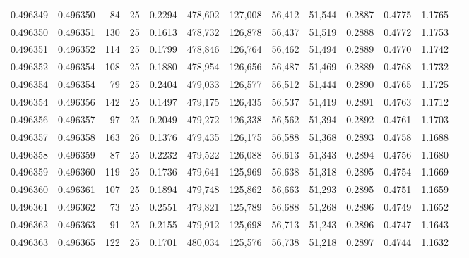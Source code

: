 \begin{tabular}{rrrrrrrrrrrrr}
0.496349 & 0.496350 &    84 &  25 &                                     0.2294 & 478,602 & 127,008 &  56,412 &  51,544 & 0.2887 & 0.4775 & 1.1765 \\
0.496350 & 0.496351 &   130 &  25 &                                     0.1613 & 478,732 & 126,878 &  56,437 &  51,519 & 0.2888 & 0.4772 & 1.1753 \\
0.496351 & 0.496352 &   114 &  25 &                                     0.1799 & 478,846 & 126,764 &  56,462 &  51,494 & 0.2889 & 0.4770 & 1.1742 \\
0.496352 & 0.496354 &   108 &  25 &                                     0.1880 & 478,954 & 126,656 &  56,487 &  51,469 & 0.2889 & 0.4768 & 1.1732 \\
0.496354 & 0.496354 &    79 &  25 &                                     0.2404 & 479,033 & 126,577 &  56,512 &  51,444 & 0.2890 & 0.4765 & 1.1725 \\
0.496354 & 0.496356 &   142 &  25 &                                     0.1497 & 479,175 & 126,435 &  56,537 &  51,419 & 0.2891 & 0.4763 & 1.1712 \\
0.496356 & 0.496357 &    97 &  25 &                                     0.2049 & 479,272 & 126,338 &  56,562 &  51,394 & 0.2892 & 0.4761 & 1.1703 \\
0.496357 & 0.496358 &   163 &  26 &                                     0.1376 & 479,435 & 126,175 &  56,588 &  51,368 & 0.2893 & 0.4758 & 1.1688 \\
0.496358 & 0.496359 &    87 &  25 &                                     0.2232 & 479,522 & 126,088 &  56,613 &  51,343 & 0.2894 & 0.4756 & 1.1680 \\
0.496359 & 0.496360 &   119 &  25 &                                     0.1736 & 479,641 & 125,969 &  56,638 &  51,318 & 0.2895 & 0.4754 & 1.1669 \\
0.496360 & 0.496361 &   107 &  25 &                                     0.1894 & 479,748 & 125,862 &  56,663 &  51,293 & 0.2895 & 0.4751 & 1.1659 \\
0.496361 & 0.496362 &    73 &  25 &                                     0.2551 & 479,821 & 125,789 &  56,688 &  51,268 & 0.2896 & 0.4749 & 1.1652 \\
0.496362 & 0.496363 &    91 &  25 &                                     0.2155 & 479,912 & 125,698 &  56,713 &  51,243 & 0.2896 & 0.4747 & 1.1643 \\
0.496363 & 0.496365 &   122 &  25 &                                     0.1701 & 480,034 & 125,576 &  56,738 &  51,218 & 0.2897 & 0.4744 & 1.1632 \\

\end{tabular}
